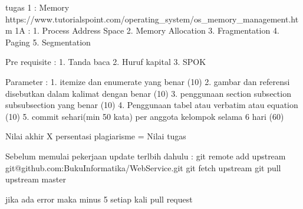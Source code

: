 tugas 1 :
Memory
https://www.tutorialspoint.com/operating_system/os_memory_management.htm
1A :
1. Process Address Space
2. Memory Allocation
3. Fragmentation
4. Paging
5. Segmentation


Pre requisite :
1. Tanda baca
2. Huruf kapital
3. SPOK

Parameter :
1. itemize dan enumerate yang benar (10)
2. gambar dan referensi disebutkan dalam kalimat dengan benar (10)
3. penggunaan section subsection subsubsection yang benar (10)
4. Penggunaan tabel atau verbatim atau equation (10)
5. commit sehari(min 50 kata) per anggota kelompok selama 6 hari (60)

Nilai akhir X persentasi plagiarisme = Nilai tugas

Sebelum memulai pekerjaan update terlbih dahulu :
git remote add upstream git@github.com:BukuInformatika/WebService.git
git fetch upstream
git pull upstream master

jika ada error maka minus 5 setiap kali pull request